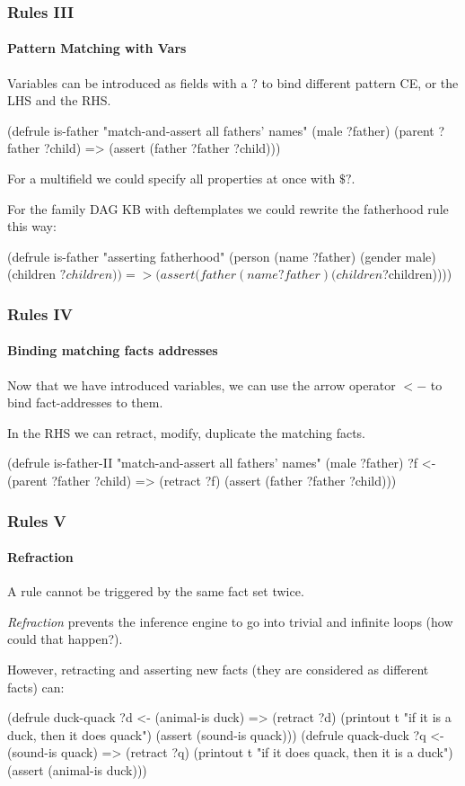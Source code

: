 \documentclass[xcolor={usenames,dvipsnames,svgnames}, compress]{beamer}
\begin{document}
\begin{frame}[fragile]
  \frametitle{Rules III}
  \framesubtitle{Pattern Matching with Vars}
  Variables can be introduced as fields with a $?$ to bind different pattern CE,
  or the LHS and the RHS.
  \begin{clips-code}[numbers=none]
    (defrule is-father
        "match-and-assert all fathers' names"
        (male ?father)
        (parent ?father ?child)
        =>
        (assert (father ?father ?child)))
  \end{clips-code}
  
  For a multifield we could specify all properties at once with
  $\$?$.\par
  For the family DAG KB with deftemplates we could rewrite the
  fatherhood rule this way:
  \begin{clips-code}[numbers=none]
    (defrule is-father
        "asserting fatherhood"
        (person (name ?father) (gender male) (children $?children))
        =>
        (assert (father (name ?father) (children $?children))))
  \end{clips-code}
\end{frame}

\begin{frame}[fragile]
  \frametitle{Rules IV}
  \framesubtitle{Binding matching facts addresses}

  Now that we have introduced variables, we can use the arrow operator $<-$ to bind fact-addresses to
  them.\par\bigskip
  
  In the RHS we can \textsf{retract}, \textsf{modify}, \textsf{duplicate} the matching facts.
  \begin{clips-code}[numbers=none]
    (defrule is-father-II
        "match-and-assert all fathers' names"
        (male ?father)
        ?f <- (parent ?father ?child)
        =>
        (retract ?f)
        (assert (father ?father ?child)))
  \end{clips-code}
\end{frame}

\begin{frame}[fragile]
  \frametitle{Rules V}
  \framesubtitle{Refraction}

  A rule cannot be triggered by the same fact set twice.\par\bigskip
  
  \emph{Refraction} prevents the inference engine to go into trivial and
  infinite loops (how could that happen?).\par\bigskip

  However, retracting and asserting new facts (they are considered as different facts)
  can:
  \begin{clips-code}
    (defrule duck-quack
        ?d <- (animal-is duck)
        =>
        (retract ?d)
        (printout t "if it is a duck, then it does quack")
        (assert (sound-is quack)))
    (defrule quack-duck
        ?q <- (sound-is quack)
        =>
        (retract ?q)
        (printout t "if it does quack, then it is a duck")
        (assert (animal-is duck)))
  \end{clips-code}
\end{frame}
\end{document}
